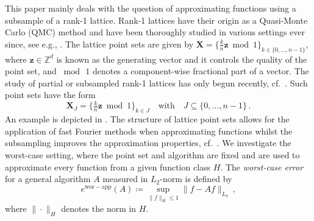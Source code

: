\documentclass[a4paper]{amsart}
\newcommand{\ewc}{e^{\mathrm{wor-app}}}
\newcommand{\modone}{\bmod{}1}
\begin{document}
This paper mainly deals with the question of approximating functions using a subsample of a rank-1 lattice.
Rank-1 lattices have their origin as a Quasi-Monte Carlo (QMC) method and have been thoroughly studied in various settings ever since, see e.g., \cite{Sloan94, kaemmererdiss, KaPoVo13, PlPoStTa18, CKNS20, DKP22}.
The lattice point sets are given by $\bm X = \{\tfrac kn\bm z\modone\}_{k\in\{0,\dots,n-1\}}$, where $\bm z\in\mathds Z^d$ is known as the generating vector and it controls the quality of the point set, and $\bmod\,1$ denotes a component-wise fractional part of a vector.
The study of partial or subsampled rank-1 lattices has only begun recently, cf.\ \cite{BKPU22}.
Such point sets have the form
\begin{equation*}
    \bm X_J = \Big\{\tfrac kn\bm z \modone \Big\}_{k\in J}
    \quad\text{with}\quad
    J\subseteq\{0,\dots,n-1\} \,.
\end{equation*}
An example is depicted in .
The structure of lattice point sets allows for the application of fast Fourier methods when approximating functions whilst the subsampling improves the approximation properties, cf.\ \cite{BSU23}.
We investigate the worst-case setting, where the point set and algorithm are fixed and are used to approximate every function from a given function class $H$.
The \emph{worst-case error} for a general algorithm $A$ measured in $L_2$-norm is defined by
\begin{equation*}
    \ewc(A)
    \coloneqq \sup_{\|f\|_H \le 1} \|f-A f\|_{L_2} \,,
\end{equation*}
where $\|\cdot\|_H$ denotes the norm in $H$.
\end{document}
